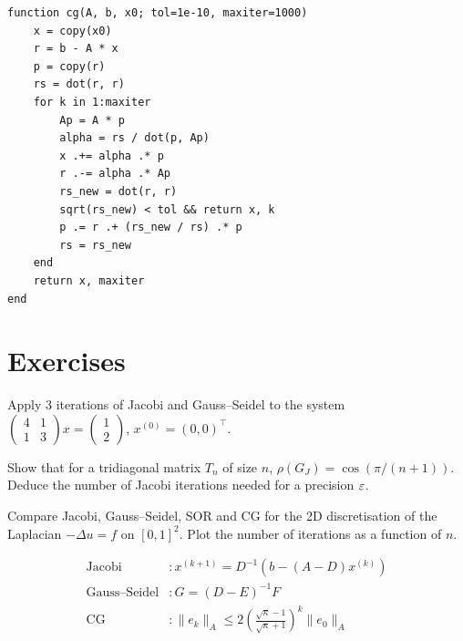 \begin{codeblock}[title=\textbf{Julia}]
\begin{verbatim}
function cg(A, b, x0; tol=1e-10, maxiter=1000)
    x = copy(x0)
    r = b - A * x
    p = copy(r)
    rs = dot(r, r)
    for k in 1:maxiter
        Ap = A * p
        alpha = rs / dot(p, Ap)
        x .+= alpha .* p
        r .-= alpha .* Ap
        rs_new = dot(r, r)
        sqrt(rs_new) < tol && return x, k
        p .= r .+ (rs_new / rs) .* p
        rs = rs_new
    end
    return x, maxiter
end
\end{verbatim}
\end{codeblock}

\section{Exercises}

\begin{exercise}[$\star$]
Apply 3 iterations of Jacobi and Gauss--Seidel to the system $\begin{pmatrix}4&1\\1&3\end{pmatrix}x=\begin{pmatrix}1\\2\end{pmatrix}$, $x^{(0)}=(0,0)^\top$.
\end{exercise}

\begin{exercise}[$\star\star$]
Show that for a tridiagonal matrix $T_n$ of size $n$, $\rho(G_J)=\cos(\pi/(n+1))$. Deduce the number of Jacobi iterations needed for a precision $\varepsilon$.
\end{exercise}

\begin{exercise}
Compare Jacobi, Gauss--Seidel, SOR and CG for the 2D discretisation of the Laplacian $-\Delta u=f$ on $[0,1]^2$. Plot the number of iterations as a function of $n$.
\end{exercise}

\begin{keyformulas}
\begin{align*}
\text{Jacobi} &: x^{(k+1)}=D^{-1}(b-(A-D)x^{(k)}) \\
\text{Gauss--Seidel} &: G=(D-E)^{-1}F \\
\text{CG} &: \|e_k\|_A\leq 2\left(\frac{\sqrt{\kappa}-1}{\sqrt{\kappa}+1}\right)^k\|e_0\|_A
\end{align*}
\end{keyformulas}
